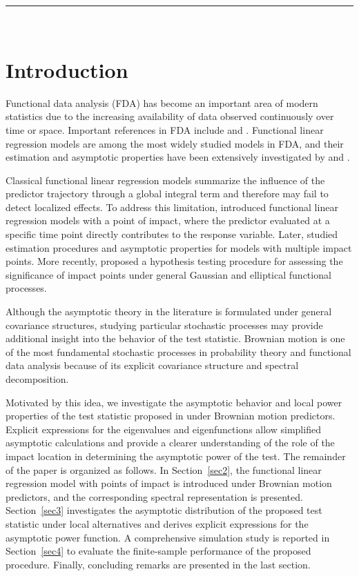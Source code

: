 \documentclass[twoside]{article}
\begin{document}
	\hspace{1cm}\rule{\textwidth}{0.2mm}\\
	
	
	\section{Introduction}
	
	Functional data analysis (FDA) has become an important area of modern statistics due to the increasing availability of data observed continuously over time or space. Important references in FDA include \cite{Ramsay2005} and \cite{Ferraty2006}. Functional linear regression models are among the most widely studied models in FDA, and their estimation and asymptotic properties have been extensively investigated by \cite{Hall2007} and \cite{Crambes2009}.
	
	Classical functional linear regression models summarize the influence of the predictor trajectory through a global integral term and therefore may fail to detect localized effects. To address this limitation, \cite{Mckeague2010} introduced functional linear regression models with a point of impact, where the predictor evaluated at a specific time point directly contributes to the response variable. Later, \cite{Kneip2016} studied estimation procedures and asymptotic properties for models with multiple impact points. More recently, \cite{Shirvani2024} proposed a hypothesis testing procedure for assessing the significance of impact points under general Gaussian and elliptical functional processes.
	
	Although the asymptotic theory in the literature is formulated under general covariance structures, studying particular stochastic processes may provide additional insight into the behavior of the test statistic. Brownian motion is one of the most fundamental stochastic processes in probability theory and functional data analysis because of its explicit covariance structure and spectral decomposition.
	
	Motivated by this idea, we investigate the asymptotic behavior and local power properties of the test statistic proposed in \cite{Shirvani2024} under Brownian motion predictors. Explicit expressions for the eigenvalues and eigenfunctions allow simplified asymptotic calculations and provide a clearer understanding of the role of the impact location in determining the asymptotic power of the test. The remainder of the paper is organized as follows. In Section~\ref{sec2}, the functional linear regression model with points of impact is introduced under Brownian motion predictors, and the corresponding spectral representation is presented. Section~\ref{sec3} investigates the asymptotic distribution of the proposed test statistic under local alternatives and derives explicit expressions for the asymptotic power function. A comprehensive simulation study is reported in Section~\ref{sec4} to evaluate the finite-sample performance of the proposed procedure. Finally, concluding remarks are presented in the last section.
	
\end{document}
